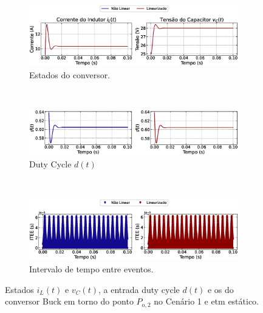 \begin{figure}[H]
  \centering
  \captionsetup{justification=centering}
  \begin{subfigure}{1.\textwidth}
    \centering
    \includegraphics[width=1.\textwidth]{figuras/static-etm/buck/sim1/op2/result.eps}
    \caption{Estados do conversor.}
    \label{fig:buck_converter_constant_pcpl_static_etm_op2_duty_a}
  \end{subfigure}
  \\[6pt]
  \begin{subfigure}{1.\textwidth}
    \centering
    \includegraphics[width=1.\textwidth]{figuras/static-etm/buck/sim1/op2/duty-cycle.eps}
    \caption{Duty Cycle $d(t)$}
    \label{fig:buck_converter_constant_pcpl_static_etm_op2_duty_b}
  \end{subfigure}
  \\[6pt]
  \begin{subfigure}{1.\textwidth}
    \centering
    \includegraphics[width=1.\textwidth]{figuras/static-etm/buck/sim1/op2/inter-event-times.eps}
    \caption{Intervalo de tempo entre eventos.}
    \label{fig:buck_converter_constant_pcpl_static_etm_op2_duty_c}
  \end{subfigure}
  \caption{Estados $i_L(t)$ e $v_C(t)$, a entrada duty cycle $d(t)$ e os  do conversor Buck em torno do ponto $P_{\mathrm{o}, 2}$ no Cenário 1 e \acrshort{etm} estático.}
\end{figure}

